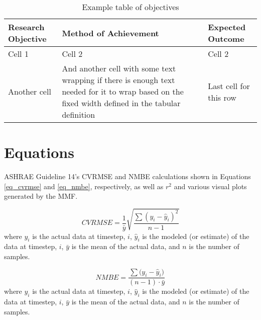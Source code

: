 \begin{table}[H]
	\centering
	\caption{Example table of objectives}
	\begin{tabular}{|L{4.5cm}|L{5.5cm}|L{5.0cm}|}
		\hline
		\textbf{Research Objective}                                                                                                                       & \textbf{Method of Achievement} & \textbf{Expected Outcome} \\ \hline \hline
		Cell 1                                                                                                                                            & Cell 2                         & Cell 2                    \\ \hline
		Another cell                                                                                                                                      &
		And another cell with some text wrapping if there is enough text needed for it to wrap based on the fixed width defined in the tabular definition &
		Last cell for this row                                                                                                                                                                                         \\ \hline
	\end{tabular}
	\label{tbl_example}
\end{table}

\section{Equations}

ASHRAE Guideline 14's \cite{Landsberg2014} \gls{CVRMSE} and \gls{NMBE} calculations shown in Equations \ref{eq_cvrmse} and \ref{eq_nmbe}, respectively, as well as $r^2$ and various visual plots generated by the \gls{MMF}.

\begin{equation}
	\label{eq_cvrmse}
	CVRMSE=\frac{1}{\bar{y}}\sqrt{\frac{\sum{(y_i-\hat{y}_i)^2}}{n-1}}
\end{equation}
where $y_i$ is the actual data at timestep, $i$, $\hat{y}_i$ is the modeled (or estimate) of the data at timestep, $i$, $\bar{y}$ is the mean of the actual data, and $n$ is the number of samples.

\bigskip

\begin{equation}
	\label{eq_nmbe}
	NMBE=\frac{\sum{(y_i - \hat{y}_i})}{(n-1) \cdot \bar{y}}
\end{equation}
where $y_i$ is the actual data at timestep, $i$, $\hat{y}_i$ is the modeled (or estimate) of the data at timestep, $i$, $\bar{y}$ is the mean of the actual data, and $n$ is the number of samples.



